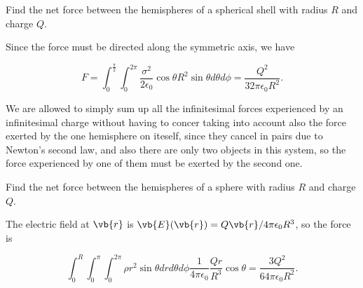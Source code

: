 \documentclass[english,a4paper,12pt]{report}
\begin{document}
{Find the net force between the hemispheres of a spherical shell with radius \(R\) and charge \(Q\).}
{Since the force must be directed along the symmetric axis, we have
		
\begin{equation}
    F = \int_{0}^{\frac{\pi }{2} } \int_{0}^{2\pi } \frac{\sigma ^2}{2 \epsilon_0} \cos \theta R^2 \sin \theta d\theta d\phi = \frac{Q^2}{32\pi  \epsilon_0 R^2 }.
\end{equation}

We are allowed to simply sum up all the infinitesimal forces experienced by an infinitesimal charge without having to concer taking into account also the force exerted by the one hemisphere on iteself, since they cancel in pairs due to Newton's second law, and also there are only two objects in this system, so the force experienced by one of them must be exerted by the second one.} 

{Find the net force between the hemispheres of a sphere with radius \(R\) and charge \(Q\).}
{The electric field at \(\vb{r} \) is \( \vb{E} (\vb{r} ) = Q \vb{r} /4\pi \epsilon _{0} R^3 \), so the force is  
		
\begin{equation}
    \int_{0}^{R} \int_{0}^{\pi } \int_{0}^{2\pi }    \rho r^2\sin \theta drd\theta d\phi  \frac{1}{4\pi\epsilon_0} \frac{Qr}{R^3 } \cos \theta = \frac{3Q^2}{64\pi  \epsilon_0 R^2 }.	
\end{equation}
} 
\end{document}
